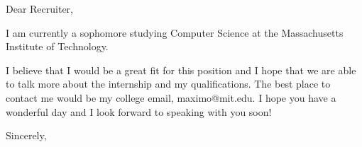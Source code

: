 \documentclass[12pt]{letter}
\begin{document}
\begin{letter}{}
    \opening{Dear Recruiter,}
    I am currently a sophomore studying Computer Science at the Massachusetts Institute of Technology.

    I believe that I would be a great fit for this position and I hope that we are able to talk more about the internship and my qualifications.
    The best place to contact me would be my college email, maximo@mit.edu. I hope you have a wonderful day and I look forward to speaking with you soon!
    \closing{Sincerely,}
\end{letter}
\end{document}
